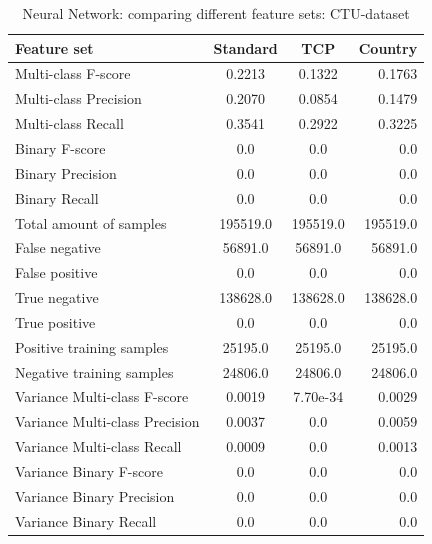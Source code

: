\begin{table}[H]
\caption{Neural Network: comparing different feature sets: CTU-dataset}
\label{tab:neural:ctu}
\centering
\begin{tabular}{l c c r}
\toprule
Feature set & Standard & TCP & Country \\
\midrule
Multi-class F-score & 0.2213 & 0.1322 & 0.1763 \\
Multi-class Precision & 0.2070 & 0.0854 & 0.1479 \\
Multi-class Recall & 0.3541 & 0.2922 & 0.3225 \\
\midrule
Binary F-score & 0.0 & 0.0 & 0.0 \\
Binary Precision & 0.0 & 0.0 & 0.0 \\
Binary Recall & 0.0 & 0.0 & 0.0 \\
\midrule
Total amount of samples & 195519.0 & 195519.0 & 195519.0 \\
False negative & 56891.0 & 56891.0 & 56891.0 \\
False positive & 0.0 & 0.0 & 0.0 \\
True negative & 138628.0 & 138628.0 & 138628.0 \\
True positive & 0.0 & 0.0 & 0.0 \\
\midrule
Positive training samples & 25195.0 & 25195.0 & 25195.0\\
Negative training samples & 24806.0 & 24806.0 & 24806.0\\
\midrule
Variance Multi-class F-score & 0.0019 & 7.70e-34 & 0.0029 \\
Variance Multi-class Precision & 0.0037 & 0.0 & 0.0059 \\
Variance Multi-class Recall & 0.0009 & 0.0 & 0.0013  \\
\midrule
Variance Binary F-score & 0.0 & 0.0 & 0.0 \\
Variance Binary Precision & 0.0 & 0.0 & 0.0 \\
Variance Binary Recall & 0.0 & 0.0 & 0.0 \\
\bottomrule
\end{tabular}
\end{table}

